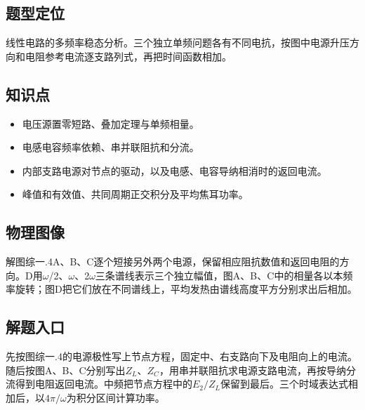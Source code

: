 \documentclass[UTF8,fontset=fandol,a4paper,11pt]{ctexart}
\begin{document}


\subsection*{题型定位}

线性电路的多频率稳态分析。三个独立单频问题各有不同电抗，按图中电源升压方向和电阻参考电流逐支路列式，再把时间函数相加。



\subsection*{知识点}

\begin{itemize}
\item 电压源置零短路、叠加定理与单频相量。
\item 电感电容频率依赖、串并联阻抗和分流。
\item 内部支路电源对节点的驱动，以及电感、电容导纳相消时的返回电流。
\item 峰值和有效值、共同周期正交积分及平均焦耳功率。
\end{itemize}



\subsection*{物理图像}

解图综一.4A、B、C逐个短接另外两个电源，保留相应阻抗数值和返回电阻的方向。D用$\omega$/2、$\omega$、2$\omega$三条谱线表示三个独立幅值，图A、B、C中的相量各以本频率旋转；图D把它们放在不同谱线上，平均发热由谱线高度平方分别求出后相加。



\subsection*{解题入口}

先按图综一.4的电源极性写上节点方程，固定中、右支路向下及电阻向上的电流。随后按图A、B、C分别写出$Z_L$、$Z_C$，用串并联阻抗求电源支路电流，再按导纳分流得到电阻返回电流。中频把节点方程中的$E_2/Z_L$保留到最后。三个时域表达式相加后，以$4\pi/\omega$为积分区间计算功率。
\end{document}

